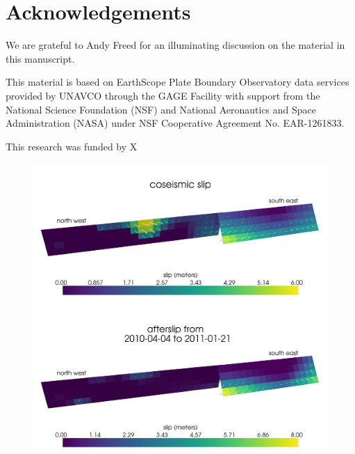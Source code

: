 \documentclass[1p]{elsarticle}
\begin{document}
\section*{Acknowledgements}
We are grateful to Andy Freed for an illuminating discussion on the material in this manuscript.  
 
This material is based on EarthScope Plate Boundary Observatory data services provided by UNAVCO through the GAGE Facility with support from the National Science Foundation (NSF) and National Aeronautics and Space Administration (NASA) under NSF Cooperative Agreement No. EAR-1261833.

This research was funded by X








\begin{figure}
\includegraphics[scale=0.09]{Figures/elasticslip}
\caption{}
\label{fig:InitialSlip}
\end{figure} 
\end{document}
